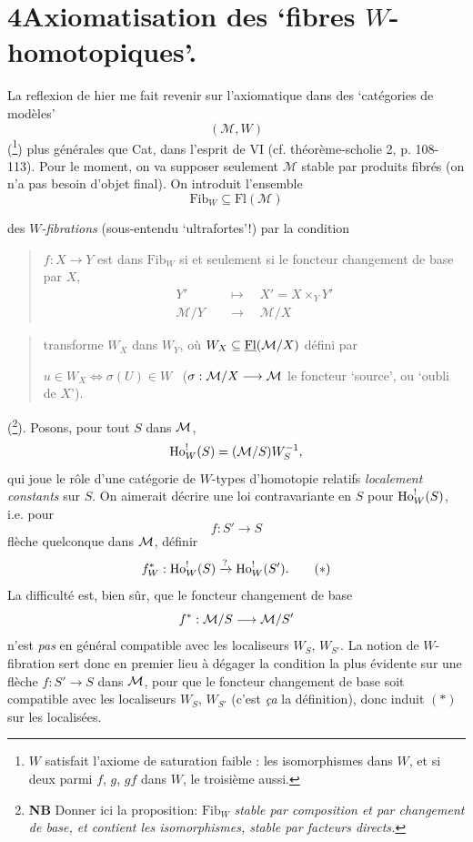 \section*{4\quad Axiomatisation des ‘fibres $W$-homotopiques’.}

La reflexion de hier me fait revenir sur l'axiomatique dans des ‘catégories de modèles’ %
\[
(\mathcal{M}, W)
\]
(\footnote[119]{$W$ satisfait l'axiome de saturation faible : les isomorphismes dans $W$, et si deux parmi $f$, $g$, $gf$ dans $W$, le troisième aussi.}) plus générales que Cat, dans l'esprit de VI (cf. théorème-scholie 2, p. 108-113). Pour le moment, on va supposer seulement $\mathcal{M}$ stable par produits fibrés (on n'a pas besoin d'objet final). On introduit l'ensemble
\[
\mathrm{Fib}_W \subseteq \mathrm{Fl}(\mathcal{M})
\]

des \textit{$W$-fibrations} (sous-entendu ‘ultrafortes’!) par la condition

\begin{quote}
$f : X \longrightarrow Y$ est dans $\mathrm{Fib}_W$ si et seulement si le foncteur changement de base par $X$,
\[
\begin{aligned}
Y' &\quad\longmapsto\quad X' = X \times_Y Y' \\
\mathcal{M}/Y &\quad\longrightarrow\quad \mathcal{M}/X
\end{aligned}
\]
\end{quote}


\begin{quote}
transforme $W_X$ dans $W_Y$, où $W_X \subseteq \underline{\mathrm{Fl}}(\mathcal{M}/X)$ défini par

$u \in W_X \iff \sigma(U) \in W$ \ ($\sigma : \mathcal{M}/X \longrightarrow \mathcal{M}$ le foncteur ‘source’, ou ‘oubli de $X$’). %
\end{quote}

(\footnote[120]{\textbf{NB} Donner ici la proposition: $\mathrm{Fib}_W$ \textit{stable par composition et par changement de base, et contient les isomorphismes, stable par facteurs directs.}}). Posons, pour tout $S$ dans $\mathcal{M}$,
\[
\mathrm{Ho}^!_W(S) = (\mathcal{M}/S)W_S^{-1},
\]
qui joue le rôle d'une catégorie de $W$-types d'homotopie relatifs \textit{localement constants} sur $S$. On aimerait décrire une loi contravariante en $S$ pour $\mathrm{Ho}^!_W(S)$, i.e. pour
\[
f : S' \longrightarrow S
\]
flèche quelconque dans $\mathcal{M}$, définir
\[
f^*_W : \Ho^!_W(S) \xrightarrow{?} \Ho^!_W(S'). \tag*{$(*)$}
\]
La difficulté est, bien sûr, que le foncteur changement de base
\[
f^* : \mathcal{M}/S \longrightarrow \mathcal{M}/S'
\]
n'est \textit{pas} en général compatible avec les  localiseurs $W_S$, $W_{S'}$. La notion de $W$-fibration sert donc en premier lieu à dégager la condition la plus évidente sur une flèche $f : S' \longrightarrow S$ dans $\mathcal{M}$, pour que le foncteur changement de base soit compatible avec les localiseurs $W_S$, $W_{S'}$ (c'est \textit{ça} la définition), donc induit $(*)$ sur les localisées.

